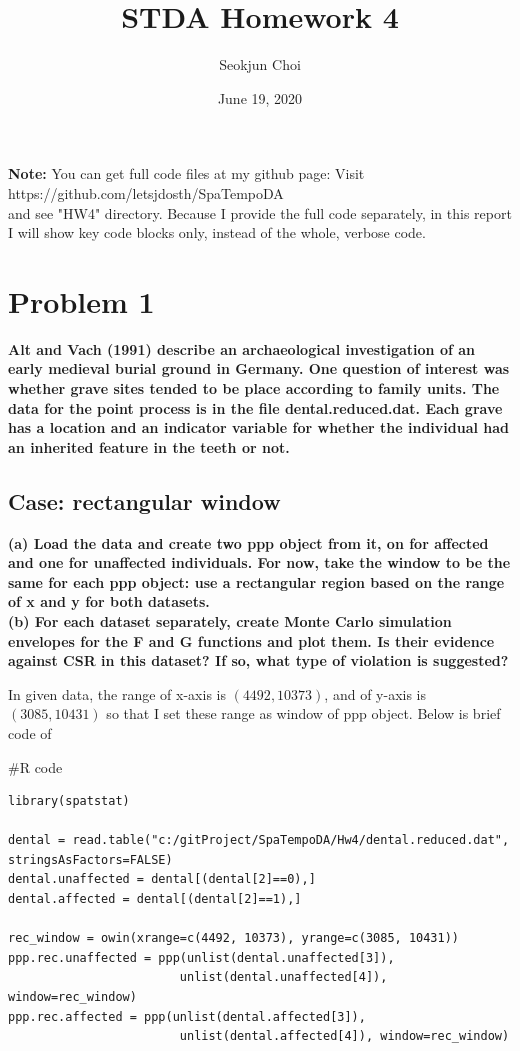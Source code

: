 \documentclass{article}
\newenvironment{Rcode}%
{%
    \begin{mdframed}
    \#R code
    \begin{small}
}
{%
    \end{small}
    \end{mdframed}
}
\begin{document}
\title{STDA Homework 4}
\author{Seokjun Choi}
\date{June 19, 2020}
\maketitle

\textbf{Note:}
You can get full code files at my github page: Visit https://github.com/letsjdosth/SpaTempoDA \\
and see "HW4" directory. Because I provide the full code separately, in this report 
I will show key code blocks only, instead of the whole, verbose code.

\section{Problem 1}
\textbf{
Alt and Vach (1991) describe an archaeological investigation of an early medieval burial ground in Germany.
One question of interest was whether grave sites tended to be place according to family units.
The data for the point process is in the file dental.reduced.dat.
Each grave has a location and an indicator variable for whether the individual had an inherited feature in the teeth or not.
}
\subsection{Case: rectangular window}
\textbf{
    (a) Load the data and create two ppp object from it, on for affected and one for unaffected individuals.
    For now, take the window to be the same for each ppp object: use a rectangular region based on the range of x and y for both datasets. \\
    (b) For each dataset separately, create Monte Carlo simulation envelopes for the F and G functions and plot them.
    Is their evidence against CSR in this dataset? If so, what type of violation is suggested?
}

In given data, the range of x-axis is $(4492, 10373)$, and of y-axis is $(3085, 10431)$ so that 
I set these range as window of ppp object.
Below is brief code of 

\begin{Rcode}
    \begin{verbatim}
library(spatstat)

dental = read.table("c:/gitProject/SpaTempoDA/Hw4/dental.reduced.dat", stringsAsFactors=FALSE)
dental.unaffected = dental[(dental[2]==0),]
dental.affected = dental[(dental[2]==1),]

rec_window = owin(xrange=c(4492, 10373), yrange=c(3085, 10431))
ppp.rec.unaffected = ppp(unlist(dental.unaffected[3]), 
                        unlist(dental.unaffected[4]), window=rec_window)
ppp.rec.affected = ppp(unlist(dental.affected[3]), 
                        unlist(dental.affected[4]), window=rec_window)
    \end{verbatim}
\end{Rcode}
\end{document}
